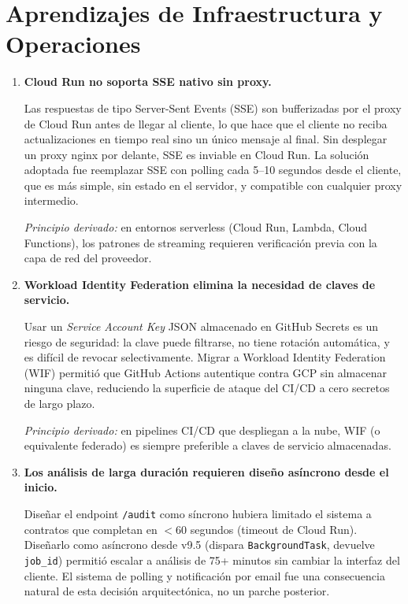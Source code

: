 \section*{Aprendizajes de Infraestructura y Operaciones}

\begin{enumerate}

    \item \textbf{Cloud Run no soporta SSE nativo sin proxy.}

    Las respuestas de tipo Server-Sent Events (SSE) son bufferizadas por
    el proxy de Cloud Run antes de llegar al cliente, lo que hace que el
    cliente no reciba actualizaciones en tiempo real sino un único mensaje
    al final. Sin desplegar un proxy nginx por delante, SSE es inviable
    en Cloud Run. La solución adoptada fue reemplazar SSE con polling
    cada 5--10 segundos desde el cliente, que es más simple, sin estado
    en el servidor, y compatible con cualquier proxy intermedio.

    \textit{Principio derivado:} en entornos serverless (Cloud Run, Lambda,
    Cloud Functions), los patrones de streaming requieren verificación
    previa con la capa de red del proveedor.

    \item \textbf{Workload Identity Federation elimina la necesidad de claves de servicio.}

    Usar un \textit{Service Account Key} JSON almacenado en GitHub Secrets
    es un riesgo de seguridad: la clave puede filtrarse, no tiene rotación
    automática, y es difícil de revocar selectivamente. Migrar a Workload
    Identity Federation (WIF) permitió que GitHub Actions autentique contra
    GCP sin almacenar ninguna clave, reduciendo la superficie de ataque del
    CI/CD a cero secretos de largo plazo.

    \textit{Principio derivado:} en pipelines CI/CD que despliegan a la nube,
    WIF (o equivalente federado) es siempre preferible a claves de servicio
    almacenadas.

    \item \textbf{Los análisis de larga duración requieren diseño asíncrono desde el inicio.}

    Diseñar el endpoint \texttt{/audit} como síncrono hubiera limitado
    el sistema a contratos que completan en $< 60$ segundos (timeout de
    Cloud Run). Diseñarlo como asíncrono desde v9.5 (dispara
    \texttt{BackgroundTask}, devuelve \texttt{job\_id}) permitió escalar
    a análisis de 75+ minutos sin cambiar la interfaz del cliente. El
    sistema de polling y notificación por email fue una consecuencia natural
    de esta decisión arquitectónica, no un parche posterior.


\end{enumerate}
